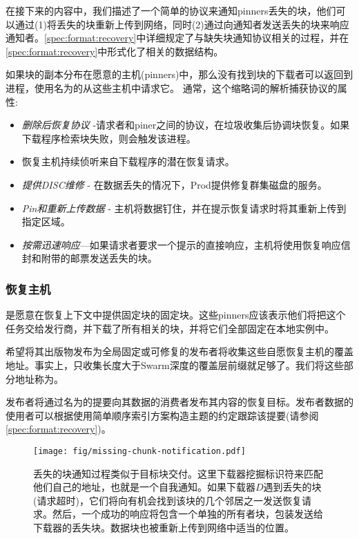 在接下来的内容中，我们描述了一个简单的协议来通知pinners丢失的块，他们可以通过(1)将丢失的块重新上传到网络，同时(2)通过向通知者发送丢失的块来响应通知者。\ref{spec:format:recovery}中详细规定了与缺失块通知协议相关的过程，并在\ref{spec:format:recovery}中形式化了相关的数据结构。

如果块的副本分布在愿意的主机(pinners)中，那么没有找到块的下载者可以返回到进程，使用名为的从这些主机中请求它。
通常，这个缩略词的解析捕获协议的属性:

\begin{itemize}
\item \emph{删除后恢复协议} -请求者和piner之间的协议，在垃圾收集后协调块恢复。如果下载程序检索块失败，则会触发该进程。
\item 恢复主机持续侦听来自下载程序的潜在恢复请求。
\item \emph{提供DISC维修} -
在数据丢失的情况下，Prod提供修复群集磁盘的服务。
\item \emph{Pin和重新上传数据} -
主机将数据钉住，并在提示恢复请求时将其重新上传到指定区域。 
\item \emph{按需迅速响应}—如果请求者要求一个提示的直接响应，主机将使用恢复响应信封和附带的邮票发送丢失的块。
\end{itemize}

\subsubsection{恢复主机}

是愿意在恢复上下文中提供固定块的固定块。这些pinners应该表示他们将把这个任务交给发行商，并下载了所有相关的块，并将它们全部固定在本地实例中。 

希望将其出版物发布为全局固定或可修复的发布者将收集这些自愿恢复主机的覆盖地址。事实上，只收集长度大于Swarm深度的覆盖层前缀就足够了。我们将这些部分地址称为。

发布者将通过名为的提要向其数据的消费者发布其内容的恢复目标。发布者数据的使用者可以根据使用简单顺序索引方案构造主题的约定跟踪该提要(请参阅\ref{spec:format:recovery})。 

\begin{figure}[htbp]
\centering
\texttt{[image: fig/missing-chunk-notification.pdf]} \caption[缺少块通知进程\statusgreen]{丢失的块通知过程类似于目标块交付。这里下载器挖掘标识符来匹配他们自己的地址，也就是一个自我通知。如果下载器$D$遇到丢失的块(请求超时)，它们将向有机会找到该块的几个邻居之一发送恢复请求。然后，一个成功的响应将包含一个单独的所有者块，包装发送给下载器的丢失块。数据块也被重新上传到网络中适当的位置。}
\label{fig:missing-chunk-notification}
\end{figure}

